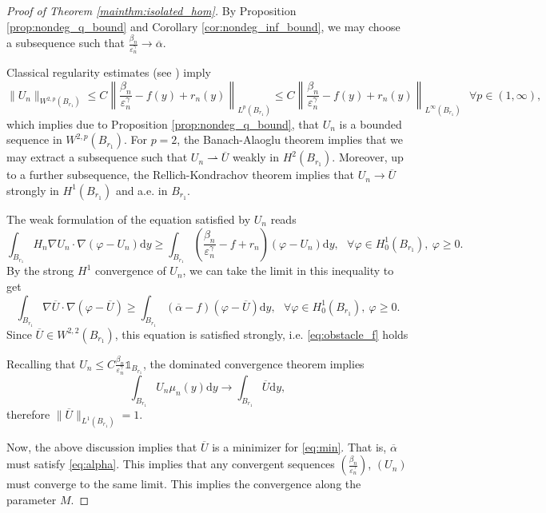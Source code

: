 \documentclass[10pt,a4paper]{article}
\newcommand{\faskip}{\hspace{8pt}}
\numberwithin{equation}{section}
\begin{document}
\begin{proof}[Proof of Theorem \ref{mainthm:isolated_hom}]
	By Proposition \ref{prop:nondeg_q_bound} and Corollary \ref{cor:nondeg_inf_bound}, we may choose a subsequence such that $ \frac{\beta_n}{\varepsilon_n^{\gamma}} \rightarrow \overline{\alpha} $. 

	Classical regularity estimates (see \cite[Lemma 9.17]{GT83}) imply 
	\begin{equation}
		\label{eq:reg_estimate}
	\|U_n\|_{W^{2,p}(B_{r_1})} \leq C\left\|\frac{\beta_n}{\varepsilon_n^{\gamma}} - f(y) + r_n(y) \right\|_{L^{p}(B_{r_1})} \leq C \left\|\frac{\beta_n}{\varepsilon_n^{\gamma}} - f(y) + r_n(y) \right\|_{L^{\infty}(B_{r_1})} \faskip \forall p \in (1,\infty),
	\end{equation}
which implies due to Proposition \ref{prop:nondeg_q_bound}, that $U_n$ is a bounded sequence in $ W^{2,p}(B_{r_1}) $. For $ p=2 $, the Banach-Alaoglu theorem implies that we may extract a subsequence such that $U_n \rightharpoonup \overline{U} $ weakly in $ H^2(B_{r_1}) $. Moreover, up to a further subsequence, the Rellich-Kondrachov theorem implies that $U_n\rightarrow \overline{U}$ strongly in $ H^1(B_{r_1}) $ and a.e. in $ B_{r_1} $.

	The weak formulation of the equation satisfied by $U_n$ reads
	\[
		\int_{B_{r_1}} H_n \nabla U_n \cdot \nabla (\varphi - U_n) \mathrm{d}y \geq \int_{B_{r_1}} \left( \frac{\beta_n}{\varepsilon_n^{\gamma}} - f + r_n \right) (\varphi - U_n) \mathrm{d}y, \faskip \forall \varphi \in H^{1}_0(B_{r_1}),~ \varphi \geq 0.
	\]
	By the strong $ H^{1} $ convergence of $U_n$, we can take the limit in this inequality to get 
	\[
		\int_{B_{r_1}} \nabla \overline{U} \cdot \nabla (\varphi - \overline{U}) \geq\int_{B_{r_1}} \left( \overline{\alpha} - f  \right) (\varphi - \overline{U}) \mathrm{d}y, \faskip \forall \varphi \in H^{1}_0(B_{r_1}),~ \varphi \geq 0. 
	\]
	Since $\overline{U}\in W^{2,2}(B_{r_1})$, this equation is satisfied strongly, i.e. \eqref{eq:obstacle_f} holds 

	Recalling that $U_n \leq C \frac{\beta_n}{\varepsilon_n^{\gamma}} \mathbb{1}_{B_{r_1}}$, the dominated convergence theorem implies
	\[ \int_{B_{r_1}}U_n \mu_n(y) \mathrm{d}y\rightarrow \int_{B_{r_1}} \overline{U}\mathrm{d}y, \]
	therefore $ \|\overline{U}\|_{L^{1}(B_{r_1})} = 1 $.

	Now, the above discussion implies that $ \overline{U} $ is a minimizer for \eqref{eq:min}. That is, $ \overline{\alpha} $ must satisfy \eqref{eq:alpha}. This implies that any convergent sequences $ (\frac{\beta_n}{\varepsilon_n^{\gamma}}) $, $ (U_n) $ must converge to the same limit. This implies the convergence along the parameter $ M $.


\end{proof}
\end{document}
